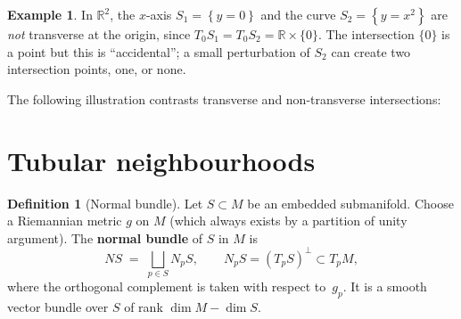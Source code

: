 \documentclass[12pt,a4paper,openany]{book}
\theoremstyle{definition}
\newtheorem{definition}[theorem]{Definition}
\newtheorem{example}[theorem]{Example}
\theoremstyle{remark}
\newcommand{\R}{\mathbb{R}}
\newcommand{\set}[1]{\left\{ #1 \right\}}
\begin{document}
\begin{example}\label{ex:non-transverse}
In $\R^2$, the $x$-axis $S_1 = \set{y = 0}$ and the curve
$S_2 = \set{y = x^2}$ are \emph{not} transverse at the origin, since
$T_0S_1 = T_0S_2 = \R \times \{0\}$.  The intersection $\{0\}$ is a
point but this is ``accidental''; a small perturbation of $S_2$ can
create two intersection points, one, or none.
\end{example}

The following illustration contrasts transverse and non-transverse
intersections:

\begin{center}
\end{center}

\section{Tubular neighbourhoods}\label{sec:tubular}

\begin{definition}[Normal bundle]\label{def:normal-bundle}%
Let $S \subset M$ be an embedded submanifold.  Choose a Riemannian metric
$g$ on $M$ (which always exists by a partition of unity argument).  The
\textbf{normal bundle} of $S$ in $M$ is
\[
  NS \;=\; \bigsqcup_{p \in S} N_pS,
  \qquad
  N_pS = (T_pS)^\perp \subset T_pM,
\]
where the orthogonal complement is taken with respect to~$g_p$.
It is a smooth vector bundle over $S$ of rank $\dim M - \dim S$.
\end{definition}
\end{document}
